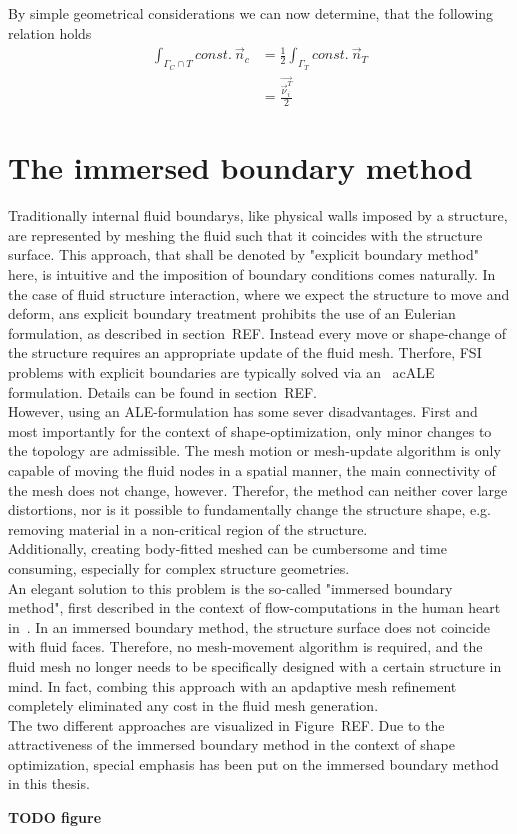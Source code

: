 \documentclass[../main.tex]{subfiles}
\begin{document}
By simple geometrical considerations we can now determine, that the following relation holds
\begin{align}\label{eq:final_relation}
\int_{\Gamma_C \cap T} const.~\vec{n}_c &= \frac{1}{2}\int_{\Gamma_T} const.~\vec{n}_T \\
                                        &= \frac{\vec{\vec{\nu}_i^T}}{2}
\end{align}





\section{The immersed boundary method}\label{sec:immersed_boundaries}
Traditionally internal fluid boundarys, like physical walls imposed by a structure, are represented by meshing the fluid such that it coincides with the structure surface. This approach, that shall be denoted by "explicit boundary method" here, is intuitive and the imposition of boundary conditions comes naturally. In the case of fluid structure interaction, where we expect the structure to move and deform, ans explicit boundary treatment prohibits the use of an Eulerian formulation, as described in section~REF. Instead every move or shape-change of the structure requires an appropriate update of the fluid mesh. Therfore, \ac{FSI} problems with explicit boundaries are typically solved via an \
ac{ALE} formulation. Details can be found in section~REF.\\
However, using an ALE-formulation has some sever disadvantages. First and most importantly for the context of shape-optimization, only minor changes to the topology are admissible. The mesh motion or mesh-update algorithm is only capable of moving the fluid nodes in a spatial manner, the main connectivity of the mesh does not change, however. Therefor, the method can neither cover large distortions, nor is it possible to fundamentally change the structure shape, e.g. removing material in a non-critical region of the structure.\\
Additionally, creating body-fitted meshed can be cumbersome and time consuming, especially for complex structure geometries.\\
An elegant solution to this problem is the so-called "immersed boundary method", first described in the context of flow-computations in the human heart in~\cite{Peskin1972}. In an immersed boundary method, the structure surface does not coincide with fluid faces. Therefore, no mesh-movement algorithm is required, and the fluid mesh no longer needs to be specifically designed with a certain structure in mind. In fact, combing this approach with an apdaptive mesh refinement completely eliminated any cost in the fluid mesh generation.\\
The two different approaches are visualized in Figure~REF.
Due to the attractiveness of the immersed boundary method in the context of shape optimization, special emphasis has been put on the immersed boundary method in this thesis.

\textbf{TODO figure}
\end{document}
